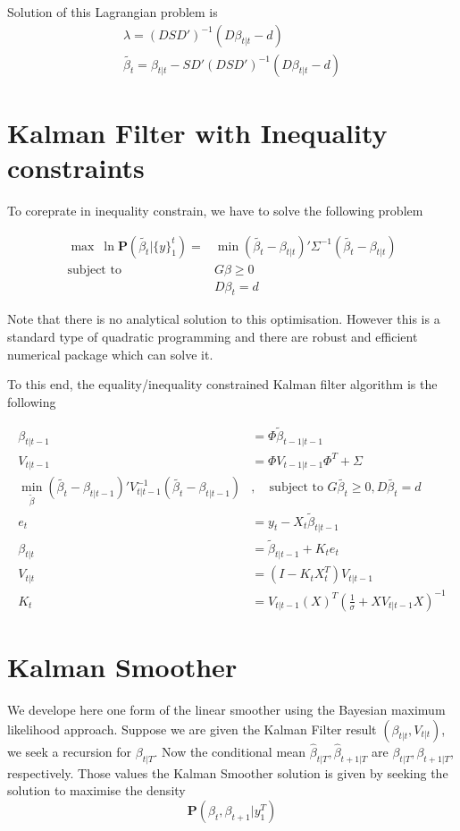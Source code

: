 \documentclass{article}
\numberwithin{algorithm}{section}
\theoremstyle{plain}
\theoremstyle{definition}
\theoremstyle{remark}
\newcommand{\PP}{\mathbf{P}}
\begin{document}
Solution of this Lagrangian problem is 
\begin{eqnarray}
\lambda = (D S D')^{-1} ( D \beta_{t|t}- d)\\
\tilde{\beta_t} = \beta_{t|t} - S D' ( D S D')^{-1} (D \beta_{t|t} - d)
\end{eqnarray}
\section{Kalman Filter with Inequality constraints}
To coreprate in inequality constrain, we have to solve the following problem 

\begin{equation}
\begin{split}
\max \: \ln \PP(\tilde{\beta_t} | \{y\}^t_1) = &\min (\tilde{\beta_t}  - \beta_{t|t})' \Sigma^{-1} (\tilde{\beta_t}  - \beta_{t|t})\\
\mbox{subject to } & G\beta \geq 0 \\ & D\beta_t = d
\end{split}
\end{equation}

Note that there is no analytical solution to this optimisation. However this is a standard type of quadratic programming and there are robust and efficient numerical package which can solve it.

To this end, the equality/inequality constrained Kalman filter algorithm is the following

\begin{equation}
\begin{split}
\beta_{t|t-1} &=\Phi \tilde{ \beta}_{t-1|t-1}\\
V_{t|t-1} &= \Phi V_{t-1|t-1}\Phi^T  + \Sigma \\
\min_{\tilde{\beta}} (\tilde{\beta_t}  - \beta_{t|t-1})' V_{t|t-1}^{-1} (\tilde{\beta_t}  - \beta_{t|t-1})&, \quad \mbox{subject to } G\tilde{\beta_t} \geq 0 ,D \tilde{\beta_t} = d\\
e_t &= y_t -  X_t\tilde{ \beta}_{t|t-1} \\
\beta_{t|t} &= \tilde{\beta}_{t|t-1} + K_t e_t\\
V_{t|t} &= (I - K_t X_t^T) V_{t|t-1}\\
K_t &=  V_{t|t-1} (X)^T (\frac1\sigma + X V_{t|t-1} X )^{-1}
\end{split}
\end{equation}


\section{Kalman Smoother}
We develope here one form of the linear smoother using the Bayesian maximum likelihood approach. 
Suppose we are given the Kalman Filter result $(\beta_{t|t}, V_{t|t})$, we seek a recursion for $\beta_{t|T}$. Now the conditional mean $\hat{\beta}_{t|T}, \hat{\beta}_{t+1|T}$ are $\beta_{t|T}, \beta_{t+1|T}$, respectively. Those values the Kalman Smoother solution is given by seeking the solution to maximise the density
\[
\PP( \beta_t, \beta_{t+1} | y_1^T)
\]
\end{document}
